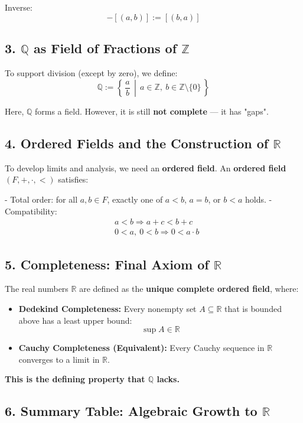 \documentclass[10pt]{article}
\begin{document}
Inverse:
$$
-[(a, b)] := [(b, a)]
$$

\subsection*{3. $\mathbb{Q}$ as Field of Fractions of $\mathbb{Z}$}

To support division (except by zero), we define:
$$
\mathbb{Q} := \left\{\, \frac{a}{b} \,\middle|\, a \in \mathbb{Z},\ b \in \mathbb{Z} \setminus \{0\} \,\right\}
$$

Here, $\mathbb{Q}$ forms a field. However, it is still \textbf{not complete} — it has "gaps".

\subsection*{4. Ordered Fields and the Construction of $\mathbb{R}$}

To develop limits and analysis, we need an \textbf{ordered field}. An \textbf{ordered field} $(F, +, \cdot, <)$ satisfies:

- Total order: for all $a, b \in F$, exactly one of $a < b$, $a = b$, or $b < a$ holds.
- Compatibility:
$$
\begin{aligned}
	& a < b \Rightarrow a + c < b + c \\
	& 0 < a,\ 0 < b \Rightarrow 0 < a \cdot b
\end{aligned}
$$

\subsection*{5. Completeness: Final Axiom of $\mathbb{R}$}

The real numbers $\mathbb{R}$ are defined as the \textbf{unique complete ordered field}, where:

\begin{itemize}
	\item \textbf{Dedekind Completeness:} Every nonempty set $A \subseteq \mathbb{R}$ that is bounded above has a least upper bound:
	$$
	\sup A \in \mathbb{R}
	$$
	\item \textbf{Cauchy Completeness (Equivalent):} Every Cauchy sequence in $\mathbb{R}$ converges to a limit in $\mathbb{R}$.
\end{itemize}

\textbf{This is the defining property that $\mathbb{Q}$ lacks.}

\subsection*{6. Summary Table: Algebraic Growth to $\mathbb{R}$}
\end{document}
